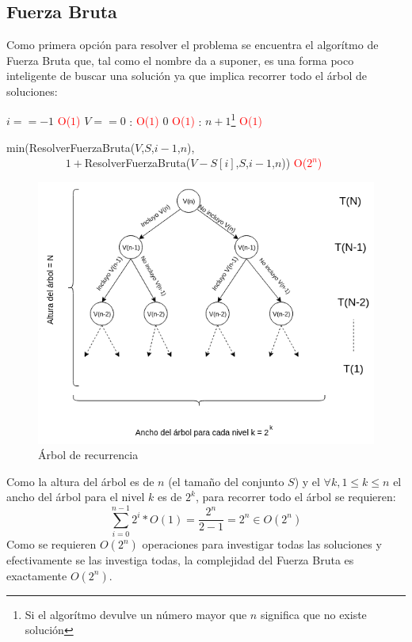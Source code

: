 \subsection{Fuerza Bruta}
Como primera opci\'on para resolver el problema se encuentra el algor\'itmo de Fuerza Bruta que, tal como el nombre
da a suponer, es una forma poco inteligente de buscar una soluci\'on ya que implica recorrer todo el \'arbol de 
soluciones:

\begin{codebox}
    \li \If $i == -1$ \textcolor{red}{O($1$)}
        \Then
    \li        \If $V == 0$ : \textcolor{red}{O($1$)}
                \Then
    \li             \Return $0$ \textcolor{red}{O($1$)}
    \li         \Else: 
    \li                 \Return $n+1$\footnote{Si el algor\'itmo devulve un n\'umero mayor que $n$ significa que no existe soluci\'on} \textcolor{red}{O($1$)}
                \End
                \End

    \li \Return min(ResolverFuerzaBruta($V$,$S$,$i-1$,$n$), \\
   $\quad\quad\quad\quad\quad$ $1 +$ResolverFuerzaBruta($V-S[i]$,$S$,$i-1$,$n$)) \textcolor{red}{O($2^n$)}

    \end{codebox}


\begin{figure}[H] 
\centering
\includegraphics[width=.8\textwidth]{img/arbolRecurrencia.png}
\caption{\'Arbol de recurrencia}
\label{fig:arbolRecurrencia}
\end{figure}

Como la altura del \'arbol es de $n$ (el tama\~no del conjunto $S$) y el $\forall k, 1\leq k \leq n$ el ancho del
\'arbol para el nivel $k$ es de $2^k$, para recorrer todo el \'arbol se requieren:
\begin{equation}
    \sum_{i=0}^{n-1} 2^i*O(1) = \frac{2^{n}}{2-1} = 2^{n} \in O(2^n)
\end{equation}
Como se requieren $O(2^n)$ operaciones para investigar todas las soluciones y efectivamente se las investiga todas,
la complejidad del Fuerza Bruta es exactamente $O(2^n)$.

